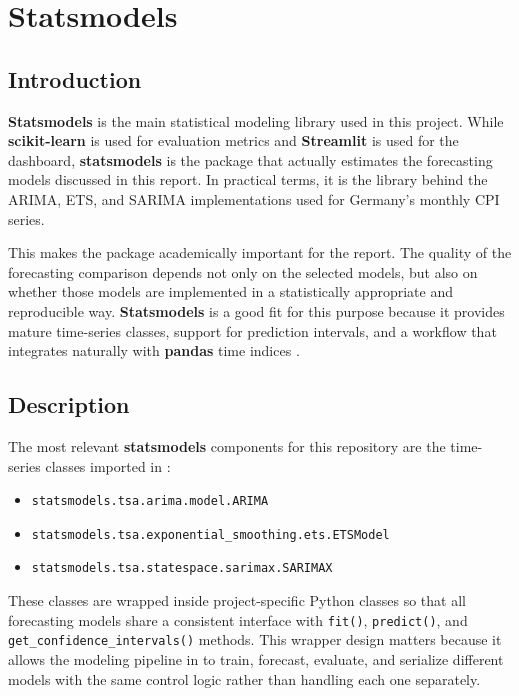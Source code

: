 %
%
%

\chapter{Statsmodels}
\label{ch:statsmodels}

\section{Introduction}

\textbf{Statsmodels} is the main statistical modeling library used in this project. While \textbf{scikit-learn} is used for evaluation metrics and \textbf{Streamlit} is used for the dashboard, \textbf{statsmodels} is the package that actually estimates the forecasting models discussed in this report. In practical terms, it is the library behind the ARIMA, ETS, and SARIMA implementations used for Germany's monthly CPI series.

This makes the package academically important for the report. The quality of the forecasting comparison depends not only on the selected models, but also on whether those models are implemented in a statistically appropriate and reproducible way. \textbf{Statsmodels} is a good fit for this purpose because it provides mature time-series classes, support for prediction intervals, and a workflow that integrates naturally with \textbf{pandas} time indices \cite{Box2015,Hyndman2021,statsmodels-doc}.

\section{Description}

The most relevant \textbf{statsmodels} components for this repository are the time-series classes imported in :

\begin{itemize}
    \item \texttt{statsmodels.tsa.arima.model.ARIMA}
    \item \texttt{statsmodels.tsa.exponential\_smoothing.ets.ETSModel}
    \item \texttt{statsmodels.tsa.statespace.sarimax.SARIMAX}
\end{itemize}

These classes are wrapped inside project-specific Python classes so that all forecasting models share a consistent interface with \texttt{fit()}, \texttt{predict()}, and \texttt{get\_confidence\_intervals()} methods. This wrapper design matters because it allows the modeling pipeline in  to train, forecast, evaluate, and serialize different models with the same control logic rather than handling each one separately.

